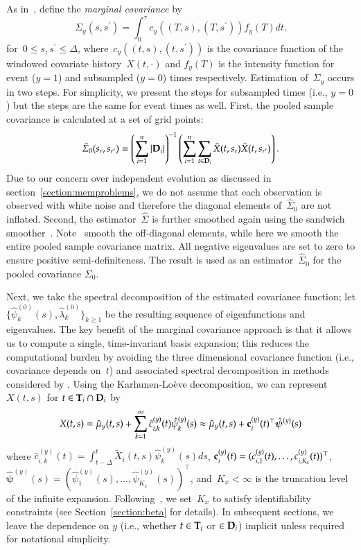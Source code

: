 \documentclass[11pt]{amsart}
\def\bfT{{\bf T}}
\def\bfD{{\bf D}}
\begin{document}
As in~\cite{Park2018}, define the \emph{marginal covariance} by
\[
\Sigma_y (s, s^\prime) = \int_{0}^\tau c_y( (T,s), (T,s^\prime) ) f_y(T) dt.
\]
for~$0 \leq s,s^\prime \leq \Delta$, where~$c_y((t,s), (t,s^\prime))$ is the covariance function of the windowed covariate history~$X(t,\cdot)$ and $f_y(T)$ is the intensity function for event ($y=1$) and subsampled ($y=0$) times respectively. Estimation of~$\Sigma_y$ occurs in two steps. For simplicity, we present the steps for subsampled times (i.e., $y=0$) but the steps are the same for event times as well. First, the pooled sample covariance is calculated at a set of grid points:
\[
\tilde \Sigma_0 (s_r , s_{r^\prime}) = \left( \sum_{i=1}^n \left | \bfD_i \right |\right)^{-1} \left( \sum_{i=1}^n \sum_{t \in \bfD_i} \tilde X (t,s_r) \tilde X (t,s_{r^\prime}) \right).
\]
Due to our concern over independent evolution as discussed in section~\ref{section:memproblems}, we do not assume that each observation is observed with white noise and therefore the diagonal elements of~$\hat \Sigma_0$ are not inflated. Second, the estimator~$\hat \Sigma$ is further smoothed again using the sandwich smoother~\citep{Xiao2013}. Note~\cite{Park2018} smooth the off-diagonal elements, while here we smooth the entire pooled sample covariance matrix. All negative eigenvalues are set to zero to ensure positive semi-definiteness. The result is used as an estimator~$\hat \Sigma_0$ for the pooled covariance $\Sigma_0$.

Next, we take the spectral decomposition of the estimated covariance function; let $\{ \hat \psi^{(0)}_k (s),\hat \lambda^{(0)}_k \}_{k \geq 1}$ be the resulting sequence of eigenfunctions and eigenvalues. The key benefit of the marginal covariance approach is that it allows us to compute a single, time-invariant basis expansion; this reduces the computational burden by avoiding the three dimensional covariance function (i.e., covariance depends on~$t$) and associated spectral decomposition in methods considered by \cite{ChenMuller2012}. Using the Karhunen-Lo{\`e}ve decomposition, we can represent~$X(t,s)$ for $t \in \bfT_i \cap \bfD_i$ by
\[
X(t,s) = \hat \mu_y (t,s) + \sum_{k=1}^{\infty} \hat c^{(y)}_{i,k} (t) \hat
\psi^{(y)}_k (s) \approx \hat \mu_y (t,s) + {\bf c}^{(y)}_{i} (t)^\top \mathbold{\hat
  \psi}^{(y)} (s)
\]
where $\hat c^{(y)}_{i,k} (t) = \int_{t-\Delta}^t \tilde X_i (t,s) \hat \psi^{(y)}_k (s) ds$, ${\bf c}^{(y)}_i (t) = (c^{(y)}_{i,1} (t), \ldots, c^{(y)}_{i,K_x} (t))^\top$, $\mathbold{\hat \psi}^{(y)} (s) = (\hat \psi^{(y)}_1 (s), \ldots, \hat \psi^{(y)}_{K_x} (s))^\top$, and~$K_x < \infty$ is the truncation level of the infinite expansion. Following~\cite{Goldsmith2011}, we set~$K_x$ to satisfy identifiability constraints (see Section~\ref{section:beta} for details). In subsequent sections, we leave the dependence on $y$ (i.e., whether $t \in \bfT_i$ or $\in \bfD_i$) implicit unless required for notational simplicity.
\end{document}
